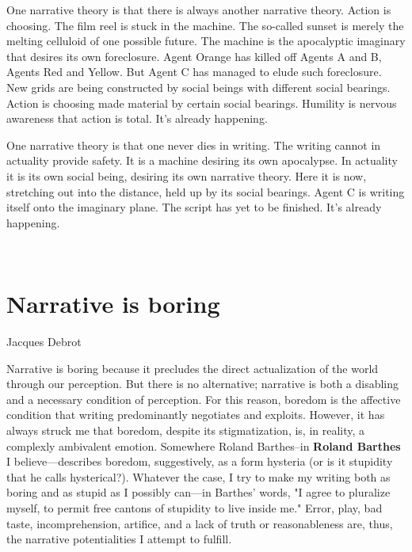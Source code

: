 One narrative theory is that there is always another narrative theory.
Action is choosing. The film reel is stuck in the machine. The so-called
sunset is merely the melting celluloid of one possible future. The
machine is the apocalyptic imaginary that desires its own foreclosure.
Agent Orange has killed off Agents A and B, Agents Red and Yellow. But
Agent C has managed to elude such foreclosure. New grids are being
constructed by social beings with different social bearings. Action is
choosing made material by certain social bearings. Humility is nervous
awareness that action is total. It's already happening.

One narrative theory is that one never dies in writing. The writing
cannot in actuality provide safety. It is a machine desiring its own
apocalypse. In actuality it is its own social being, desiring its own
narrative theory. Here it is now, stretching out into the distance, held
up by its social bearings. Agent C is writing itself onto the imaginary
plane. The script has yet to be finished. It's already happening.

~

\hypertarget{narrative-is-boring}{%
\section{Narrative is boring}\label{narrative-is-boring}}

Jacques Debrot

Narrative is boring because it precludes the direct actualization of the
world through our perception. But there is no alternative; narrative is
both a disabling and a necessary condition of perception. For this
reason, boredom is the affective condition that writing predominantly
negotiates and exploits. However, it has always struck me that boredom,
despite its stigmatization, is, in reality, a complexly ambivalent
emotion. Somewhere Roland Barthes--in \textbf{Roland Barthes} I
believe---describes boredom, suggestively, as a form hysteria (or is it
stupidity that he calls hysterical?). Whatever the case, I try to make
my writing both as boring and as stupid as I possibly can---in Barthes'
words, "I agree to pluralize myself, to permit free cantons of stupidity
to live inside me." Error, play, bad taste, incomprehension, artifice,
and a lack of truth or reasonableness are, thus, the narrative
potentialities I attempt to fulfill.

